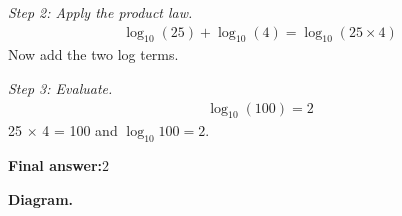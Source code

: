 \documentclass[11pt]{article}
\begin{document}
\textit{Step 2: Apply the product law.}
\[\begin{gathered}
\log_{10}(25) + \log_{10}(4) = \log_{10}(25 \times 4)
\end{gathered}\]
Now add the two log terms.

\textit{Step 3: Evaluate.}
\[\begin{gathered}
\log_{10}(100) = 2
\end{gathered}\]
25 $\times$ 4 = 100 and \( \log_{10} 100 = 2 \).

\begin{answerbox}
\textbf{Final answer:}\quad \(\displaystyle  2 \)
\end{answerbox}
\textbf{Diagram.}

\begin{center}
\end{center}
\end{document}
